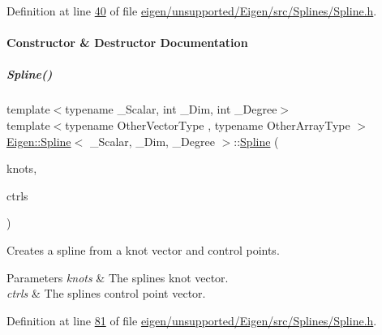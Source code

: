 Definition at line \hyperlink{eigen_2unsupported_2_eigen_2src_2_splines_2_spline_8h_source_l00040}{40} of file \hyperlink{eigen_2unsupported_2_eigen_2src_2_splines_2_spline_8h_source}{eigen/unsupported/\+Eigen/src/\+Splines/\+Spline.\+h}.



\paragraph{Constructor \& Destructor Documentation}
\mbox{\label{group___splines___module_ac9dfdbeabf9573642d970e29e92dd2be}} 
\subparagraph{\texorpdfstring{Spline()}{Spline()}\hspace{0.1cm}{\footnotesize\ttfamily [1/4]}}
{\footnotesize\ttfamily template$<$typename \+\_\+\+Scalar, int \+\_\+\+Dim, int \+\_\+\+Degree$>$ \\
template$<$typename Other\+Vector\+Type , typename Other\+Array\+Type $>$ \\
\hyperlink{group___splines___module_class_eigen_1_1_spline}{Eigen\+::\+Spline}$<$ \+\_\+\+Scalar, \+\_\+\+Dim, \+\_\+\+Degree $>$\+::\hyperlink{group___splines___module_class_eigen_1_1_spline}{Spline} (\begin{DoxyParamCaption}\item[{const Other\+Vector\+Type \&}]{knots,  }\item[{const Other\+Array\+Type \&}]{ctrls }\end{DoxyParamCaption})\hspace{0.3cm}{\ttfamily [inline]}}



Creates a spline from a knot vector and control points. 


\begin{DoxyParams}{Parameters}
{\em knots} & The spline\textquotesingle{}s knot vector. \\
\hline
{\em ctrls} & The spline\textquotesingle{}s control point vector. \\
\hline
\end{DoxyParams}


Definition at line \hyperlink{eigen_2unsupported_2_eigen_2src_2_splines_2_spline_8h_source_l00081}{81} of file \hyperlink{eigen_2unsupported_2_eigen_2src_2_splines_2_spline_8h_source}{eigen/unsupported/\+Eigen/src/\+Splines/\+Spline.\+h}.

